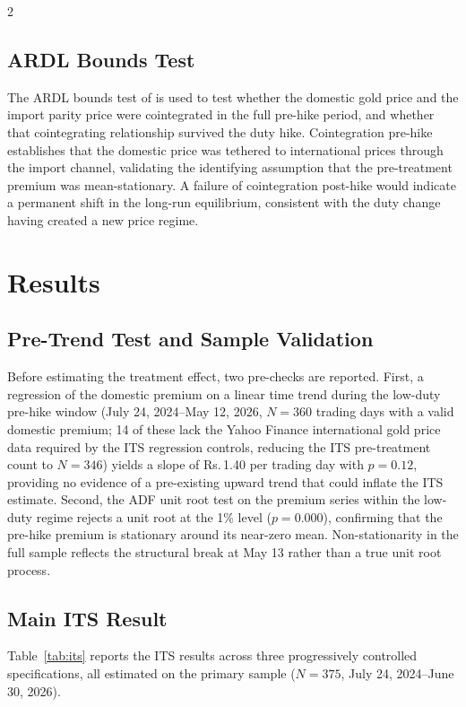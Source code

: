 \documentclass[12pt]{article}
\begin{document}
\begin{multicols}{2}
\subsection*{ARDL Bounds Test}

The ARDL bounds test of \citet{Pesaran2001} is used to test whether the domestic gold price and the import parity price were cointegrated in the full pre-hike period, and whether that cointegrating relationship survived the duty hike. Cointegration pre-hike establishes that the domestic price was tethered to international prices through the import channel, validating the identifying assumption that the pre-treatment premium was mean-stationary. A failure of cointegration post-hike would indicate a permanent shift in the long-run equilibrium, consistent with the duty change having created a new price regime.

\section{Results}
\label{sec:results}

\subsection*{Pre-Trend Test and Sample Validation}

Before estimating the treatment effect, two pre-checks are reported. First, a regression of the domestic premium on a linear time trend during the low-duty pre-hike window (July 24, 2024--May 12, 2026, $N = 360$ trading days with a valid domestic premium; 14 of these lack the Yahoo Finance international gold price data required by the ITS regression controls, reducing the ITS pre-treatment count to $N = 346$) yields a slope of Rs.\,1.40 per trading day with $p = 0.12$, providing no evidence of a pre-existing upward trend that could inflate the ITS estimate. Second, the ADF unit root test on the premium series within the low-duty regime rejects a unit root at the 1\% level ($p = 0.000$), confirming that the pre-hike premium is stationary around its near-zero mean. Non-stationarity in the full sample reflects the structural break at May 13 rather than a true unit root process.

\subsection*{Main ITS Result}

Table~\ref{tab:its} reports the ITS results across three progressively controlled specifications, all estimated on the primary sample ($N = 375$, July 24, 2024--June 30, 2026).

\end{multicols}
\end{document}
